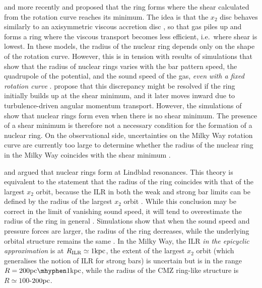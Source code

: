 \cite{Lesch1990} and more recently \cite{Krumholz2015} and \cite{Krumholz2017} proposed that the ring forms where the shear calculated from the rotation curve reaches its minimum. The idea is that the $x_2$ disc behaves similarly to an axisymmetric viscous accretion disc \citep{Lynden-Bell1974}, so that gas piles up and forms a ring where the viscous transport becomes less efficient, i.e.\ where shear is lowest. In these models, the radius of the nuclear ring depends only on the shape of the rotation curve. However, this is in tension with results of simulations that show that the radius of nuclear rings varies with the bar pattern speed, the quadrupole of the potential, and the sound speed of the gas, \emph{even with a fixed rotation curve} \citep{Patsis2000,Kim2012a,Sormani2015a}. \citet{Armillotta2019} propose that this discrepancy might be resolved if the ring initially builds up at the shear minimum, and it later moves inward due to turbulence-driven angular momentum transport. However, the simulations of \cite{Sormani2020c} show that nuclear rings form even when there is no shear minimum. The presence of a shear minimum is therefore not a necessary condition for the formation of a nuclear ring. On the observational side, uncertainties on the Milky Way rotation curve are currently too large to determine whether the radius of the nuclear ring in the Milky Way coincides with the shear minimum \citep{Sormani2020a}.

\cite{Combes1988} and \cite{Buta1996} argued that nuclear rings form at Lindblad resonances. This theory is equivalent to the statement that the radius of the ring coincides with that of the largest $x_2$ orbit, because the ILR in both the weak and strong bar limits can be defined by the radius of the largest $x_2$ orbit \citep{VanAlbada1982}. While this conclusion may be correct in the limit of vanishing sound speed, it will tend to overestimate the radius of the ring in general \citep{Sormani2020c}. Simulations show that when the sound speed and pressure forces are larger, the radius of the ring decreases, while the underlying orbital structure remains the same \citep[e.g.][]{Englmaier1997,Patsis2000,Sormani2015c}. In the Milky Way, the ILR \emph{in the epicyclic approximation} is at $R_{\rm ILR}\simeq 1\mbox{${\rm kpc}$}$, the extent of the largest $x_2$ orbit (which generalises the notion of ILR for strong bars) is uncertain but is in the range $R=200\pc\mhyphen1\kpc$, while the radius of the CMZ ring-like structure is $R\simeq100$-$200\mbox{${\rm pc}$}$.

